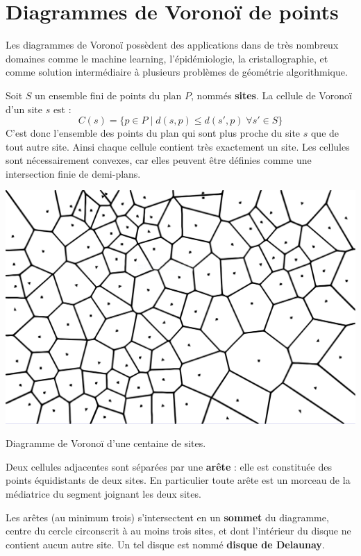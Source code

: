 \documentclass[a4paper, 10pt]{article}
\begin{document}
\section{Diagrammes de Voronoï de points}  
Les diagrammes de Voronoï possèdent des applications dans de très nombreux domaines comme le machine learning, l'épidémiologie, la cristallographie, et comme solution intermédiaire à plusieurs problèmes de géométrie algorithmique.  
  
Soit $S$ un ensemble fini de points du plan $P$, nommés \textbf{sites}. La cellule de Voronoï d'un site $s$ est :  
$$C(s)=\{p\in P\;|\;d(s, p)\leq d(s', p)\;\forall s'\in S\}$$
C'est donc l'ensemble des points du plan qui sont plus proche du site $s$ que de tout autre site. Ainsi chaque cellule contient très exactement un site. Les cellules sont nécessairement convexes, car elles peuvent être définies comme une intersection finie de demi-plans.  

\begin{center}  
\includegraphics[scale=0.25]{PointsRelax.pdf}  
  
Diagramme de Voronoï d'une centaine de sites.
\end{center}
  
Deux cellules adjacentes sont séparées par une \textbf{arête} : elle est constituée des points équidistants de deux sites. En particulier toute arête est un morceau de la médiatrice du segment joignant les deux sites.  
  
Les arêtes (au minimum trois) s'intersectent en un \textbf{sommet} du diagramme, centre du cercle circonscrit à au moins trois sites, et dont l'intérieur du disque ne contient aucun autre site. Un tel disque est nommé \textbf{disque de Delaunay}.  
  
\end{document}

